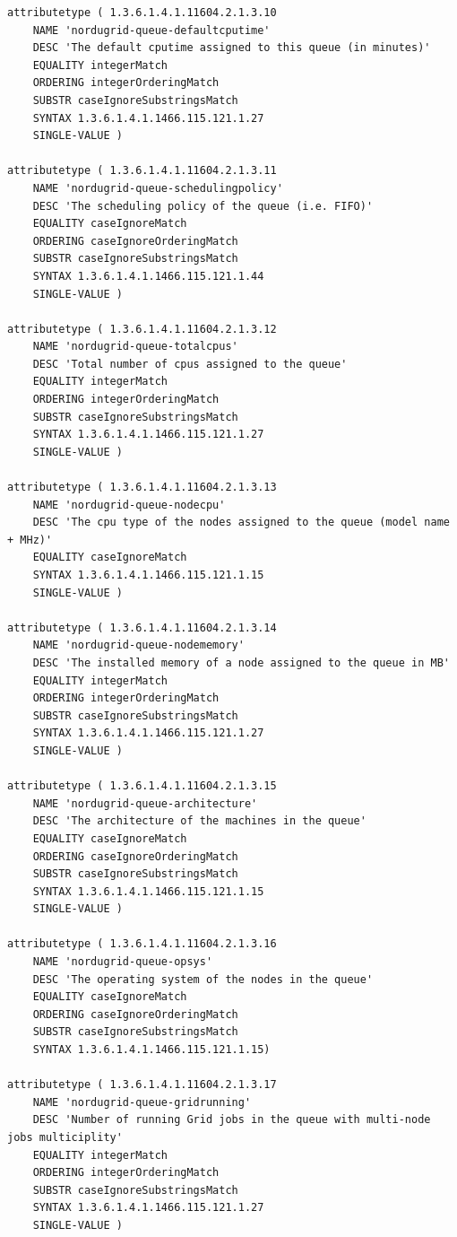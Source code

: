 \documentclass{article}
\begin{document}
\begin{verbatim}
attributetype ( 1.3.6.1.4.1.11604.2.1.3.10
    NAME 'nordugrid-queue-defaultcputime'
    DESC 'The default cputime assigned to this queue (in minutes)'
    EQUALITY integerMatch
    ORDERING integerOrderingMatch
    SUBSTR caseIgnoreSubstringsMatch
    SYNTAX 1.3.6.1.4.1.1466.115.121.1.27
    SINGLE-VALUE )

attributetype ( 1.3.6.1.4.1.11604.2.1.3.11
    NAME 'nordugrid-queue-schedulingpolicy'
    DESC 'The scheduling policy of the queue (i.e. FIFO)'
    EQUALITY caseIgnoreMatch
    ORDERING caseIgnoreOrderingMatch
    SUBSTR caseIgnoreSubstringsMatch
    SYNTAX 1.3.6.1.4.1.1466.115.121.1.44
    SINGLE-VALUE )

attributetype ( 1.3.6.1.4.1.11604.2.1.3.12
    NAME 'nordugrid-queue-totalcpus'
    DESC 'Total number of cpus assigned to the queue'
    EQUALITY integerMatch
    ORDERING integerOrderingMatch
    SUBSTR caseIgnoreSubstringsMatch
    SYNTAX 1.3.6.1.4.1.1466.115.121.1.27
    SINGLE-VALUE )

attributetype ( 1.3.6.1.4.1.11604.2.1.3.13
    NAME 'nordugrid-queue-nodecpu'
    DESC 'The cpu type of the nodes assigned to the queue (model name + MHz)'
    EQUALITY caseIgnoreMatch
    SYNTAX 1.3.6.1.4.1.1466.115.121.1.15
    SINGLE-VALUE )

attributetype ( 1.3.6.1.4.1.11604.2.1.3.14
    NAME 'nordugrid-queue-nodememory'
    DESC 'The installed memory of a node assigned to the queue in MB'
    EQUALITY integerMatch
    ORDERING integerOrderingMatch
    SUBSTR caseIgnoreSubstringsMatch
    SYNTAX 1.3.6.1.4.1.1466.115.121.1.27
    SINGLE-VALUE )

attributetype ( 1.3.6.1.4.1.11604.2.1.3.15
    NAME 'nordugrid-queue-architecture'
    DESC 'The architecture of the machines in the queue'
    EQUALITY caseIgnoreMatch
    ORDERING caseIgnoreOrderingMatch
    SUBSTR caseIgnoreSubstringsMatch
    SYNTAX 1.3.6.1.4.1.1466.115.121.1.15
    SINGLE-VALUE )
    
attributetype ( 1.3.6.1.4.1.11604.2.1.3.16
    NAME 'nordugrid-queue-opsys'
    DESC 'The operating system of the nodes in the queue'
    EQUALITY caseIgnoreMatch
    ORDERING caseIgnoreOrderingMatch
    SUBSTR caseIgnoreSubstringsMatch
    SYNTAX 1.3.6.1.4.1.1466.115.121.1.15)
        
attributetype ( 1.3.6.1.4.1.11604.2.1.3.17
    NAME 'nordugrid-queue-gridrunning'
    DESC 'Number of running Grid jobs in the queue with multi-node jobs multiciplity'
    EQUALITY integerMatch
    ORDERING integerOrderingMatch
    SUBSTR caseIgnoreSubstringsMatch
    SYNTAX 1.3.6.1.4.1.1466.115.121.1.27
    SINGLE-VALUE )


\end{verbatim}
\end{document}
